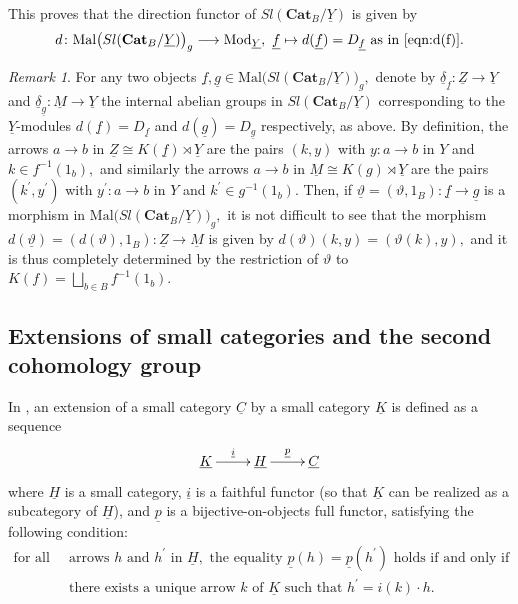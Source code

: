 \documentclass[11pt]{amsart}
\theoremstyle{plain}
\theoremstyle{definition}
\theoremstyle{remark}
\newtheorem{remark}[subsubsection]{Remark}
\newcommand{\un}{\underline}
\begin{document}
 This proves that the direction functor of $Sl(\mathbf{Cat}_B/\un{Y})$ is given by
\begin{equation}
\label{eqn:direction_functor_eq}
d\colon\mathrm{Mal}\big(Sl(\mathbf{Cat}_B/\un{Y})\big)_g\longrightarrow \mathrm{Mod}_{\un{Y}}, \ \un{f}\mapsto d(\un{f})=D_{\un{f}} \ \text{as in } \eqref{eqn:d(f)}.
\end{equation}
\begin{remark}
\label{rmk:d_on_morphisms}
For any two objects $\un{f},\un{g}\in\mathrm{Mal}\big(Sl(\mathbf{Cat}_B/\un{Y})\big)_g,$ denote by $\un{\delta}_{\un{f}}\colon\un{Z}\rightarrow\un{Y}$ and $\un{\delta}_{\un{g}}\colon\un{M}\rightarrow\un{Y}$ the internal abelian groups in $Sl(\mathbf{Cat}_B/\un{Y})$ corresponding to the $\un{Y}$-modules $d(\un{f})=D_{\un{f}}$ and $d(\un{g})=D_{\un{g}}$ respectively, as above. By definition, the arrows $a\rightarrow b$ in $\un{Z}\cong K(\un{f})\rtimes\un{Y}$ are the pairs $(k,y)$ with $y\colon a\rightarrow b$ in $Y$ and $k\in f^{-1}(1_b),$ and similarly the arrows $a\rightarrow b$ in $\un{M}\cong K(g)\rtimes\un{Y}$ are the pairs $(k^\prime,y^\prime)$ with $y^\prime\colon a\rightarrow b$ in $Y$ and $k^\prime\in g^{-1}(1_b).$ Then, if $\un{\vartheta}=(\vartheta,1_B)\colon\un{f}\rightarrow\un{g}$ is a morphism in $\mathrm{Mal}\big(Sl(\mathbf{Cat}_B/\un{Y})\big)_g,$ it is not difficult to see that the morphism $d(\un{\vartheta})=(d(\vartheta),1_B)\colon\un{Z}\rightarrow\un{M}$ is given by $d(\vartheta)(k,y)=(\vartheta(k),y),$ and it is thus completely determined by the restriction of $\vartheta$ to $K(f)=\bigsqcup_{b\in B}f^{-1}(1_b).$
\end{remark}

\subsection{Extensions of small categories and the second cohomology group}
In \cite{cocat, hoff}, an extension of a small category $\un{C}$ by a small category $\un{K}$ is defined as a sequence
\begin{equation}
\label{eqn:ext_of_cat}
\xymatrix{ {\un{K}} \ar[r]^-{\un{i}} &{\un{H}} \ar[r]^-{\un{p}} &{\un{C}}}
\end{equation}
where $\un{H}$ is a small category, $\un{i}$ is a faithful functor (so that $\un{K}$ can be realized as a subcategory of $\un{H}$), and $\un{p}$ is a bijective-on-objects full functor, satisfying the following condition:
\begin{equation}
\tag{$\ast$}
\begin{split}
 \text{for all } &\text{ arrows } h \text{ and } h^\prime \text{ in } \un{H}, \text{ the equality } \un{p}(h)=\un{p}(h^\prime) \text{ holds if and only if } \\ &\text{ there exists a unique arrow } k \text{ of } \un{K} \text{ such that } h^\prime=i(k)\cdot h.
\end{split}
\end{equation}
\end{document}
